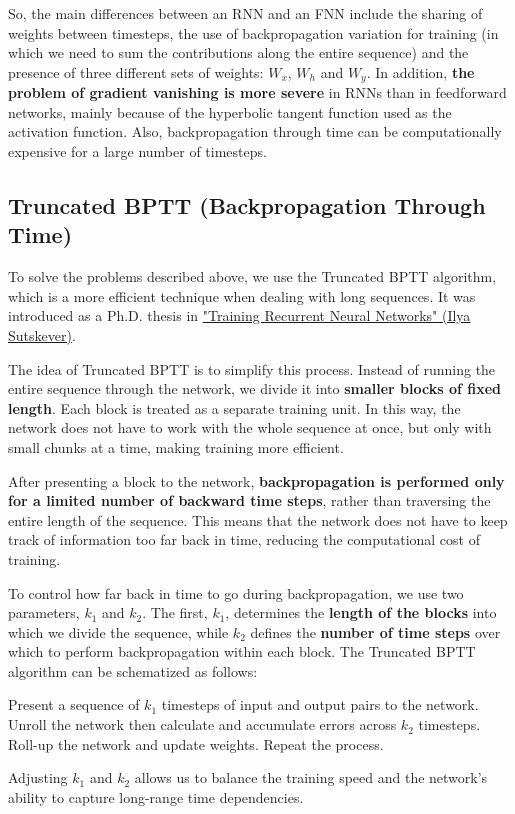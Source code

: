 So, the main differences between an RNN and an FNN include the sharing of weights between timesteps, the use of backpropagation variation for training (in which we need to sum the contributions along the entire sequence) and the presence of three different sets of weights: $W_x$, $W_h$ and $W_y$. In addition, \textbf{the problem of gradient vanishing is more severe} in RNNs than in feedforward networks, mainly because of the hyperbolic tangent function used as the activation function. Also, backpropagation through time can be computationally expensive for a large number of timesteps.


\subsection{Truncated BPTT (Backpropagation Through Time)}


To solve the problems described above, we use the Truncated BPTT algorithm, which is a more efficient technique when dealing with long sequences. It was introduced as a Ph.D. thesis in \href{https://www.cs.utoronto.ca/~ilya/pubs/ilya_sutskever_phd_thesis.pdf}{"Training Recurrent Neural Networks" (Ilya Sutskever)}.

The idea of Truncated BPTT is to simplify this process. Instead of running the entire sequence through the network, we divide it into \textbf{smaller blocks of fixed length}. Each block is treated as a separate training unit. In this way, the network does not have to work with the whole sequence at once, but only with small chunks at a time, making training more efficient.

After presenting a block to the network, \textbf{backpropagation is performed only for a limited number of backward time steps}, rather than traversing the entire length of the sequence. This means that the network does not have to keep track of information too far back in time, reducing the computational cost of training.

To control how far back in time to go during backpropagation, we use two parameters, $k_1$ and $k_2$. The first, $k_1$, determines the \textbf{length of the blocks} into which we divide the sequence, while $k_2$ defines the \textbf{number of time steps} over which to perform backpropagation within each block. The Truncated BPTT algorithm can be schematized as follows:

\begin{algorithm}
\renewcommand\thealgorithm{}
\caption{}
\begin{algorithmic}[1]
\STATE Present a sequence of $k_1$ timesteps of input and output pairs to the network.
\STATE Unroll the network then calculate and accumulate errors across $k_2$ timesteps.
\STATE Roll-up the network and update weights.
\STATE Repeat the process.
\end{algorithmic}
\end{algorithm}
Adjusting $k_1$ and $k_2$ allows us to balance the training speed and the network's ability to capture long-range time dependencies.

